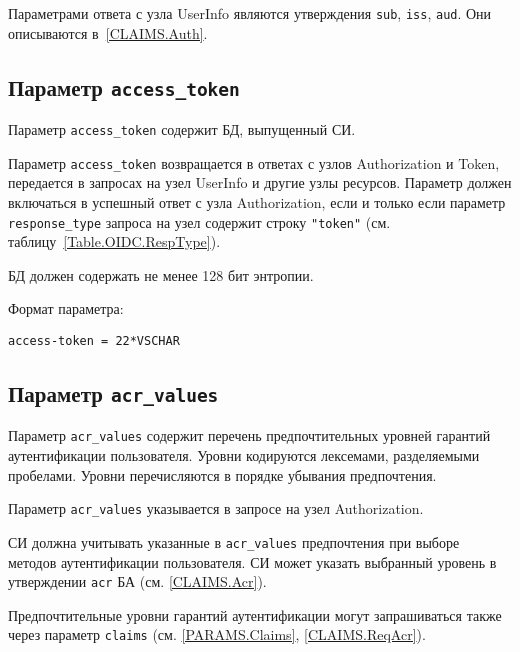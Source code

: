 Параметрами ответа с узла UserInfo являются утверждения \lstinline{sub}, 
\lstinline{iss}, \lstinline{aud}. Они описываются в~\ref{CLAIMS.Auth}.

\subsection{Параметр \lstinline{access_token}}\label{PARAMS.AccessToken}

Параметр \lstinline{access_token} содержит БД, выпущенный СИ.

Параметр \lstinline{access_token} возвращается в ответах с узлов Authorization и 
Token, передается в запросах на узел UserInfo и другие узлы ресурсов.
%
Параметр должен включаться в успешный ответ с узла 
Authorization, если и только если параметр \lstinline{response_type} запроса 
на узел содержит строку \lstinline{"token"} 
(см. таблицу~\ref{Table.OIDC.RespType}).

БД должен содержать не менее 128 бит энтропии.

Формат параметра:
\begin{lstlisting}
access-token = 22*VSCHAR
\end{lstlisting}


\subsection{Параметр \lstinline{acr_values}}\label{PARAMS.AcrValues} 

Параметр \lstinline{acr_values} содержит перечень предпочтительных
уровней гарантий аутентификации пользователя. Уровни кодируются лексемами, 
разделяемыми пробелами. Уровни перечисляются в порядке убывания предпочтения.

Параметр \lstinline{acr_values} указывается в запросе на узел Authorization.

СИ должна учитывать указанные в \lstinline{acr_values} предпочтения при выборе 
методов аутентификации пользователя.
% 
СИ может указать выбранный уровень в утверждении \lstinline{acr} БА 
(см. \ref{CLAIMS.Acr}).
%

\begin{note*}
Предпочтительные уровни гарантий аутентификации могут запрашиваться также через 
параметр \lstinline{claims} (см. \ref{PARAMS.Claims}, \ref{CLAIMS.ReqAcr}).
\end{note*}

